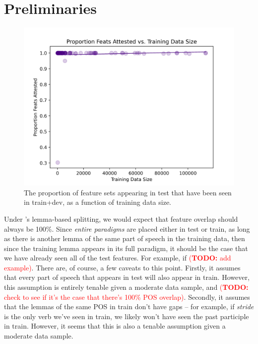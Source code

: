 \documentclass[11pt]{article}
\newcommand{\todo}[1]{\textcolor{red}{(\textbf{TODO:} #1)}}
\begin{document}
\newpage
\section{Preliminaries}
\begin{figure}
\centering
\includegraphics[width=\linewidth]{figs/feats_attested.png}
\caption{The proportion of feature sets appearing in test that have been seen in train+dev, as a function of training data size.}
\label{feats_attested}
\end{figure}

Under \citeauthor{goldman-etal-2022-un}'s lemma-based splitting, we would expect that feature overlap should always be 100\%. 
Since \textit{entire paradigms} are placed either in test or train, as long as there is another lemma of the same part of speech in the training data, then since the training lemma appears in its full paradigm, it should be the case that we have already seen all of the test features. 
For example, if \todo{add example}.
There are, of course, a few caveats to this point. 
Firstly, it assumes that every part of speech that appears in test will also appear in train. However, this assumption is entirely tenable given a moderate data sample, and \todo{check to see if it's the case that there's 100\% POS overlap}. 
Secondly, it assumes that the lemmas of the same POS in train don't have gaps -- for example, if \textit{stride} is the only verb we've seen in train, we likely won't have seen the past participle in train. 
However, it seems that this is also a tenable assumption given a moderate data sample. 
\end{document}

